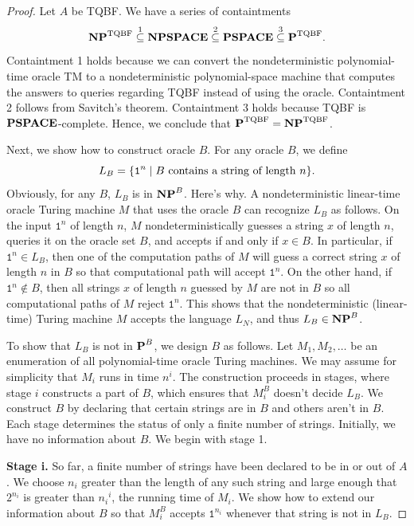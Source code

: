 \begin{proof}
  Let $A$ be TQBF. We have a series of containtments
  \[ \textbf{NP}^{\text{TQBF}} \overset{1}{\subseteq} \textbf{NPSPACE} \overset{2}{\subseteq} \textbf{PSPACE} \overset{3}{\subseteq} \textbf{P}^{\text{TQBF}}. \]
  Containtment 1 holds because we can convert the nondeterministic polynomial-time oracle TM to a nondeterministic polynomial-space machine that computes the answers to queries regarding TQBF instead of using the oracle. Containtment 2 follows from Savitch's theorem. Containtment 3 holds because TQBF is $\textbf{PSPACE}$-complete. Hence, we conclude that $\textbf{P}^{\text{TQBF}} = \textbf{NP}^{\text{TQBF}}$.

  Next, we show how to construct oracle $B$. For any oracle $B$, we define
  \[ L_B = \{ \texttt{1}^n \mid \text{$B$ contains a string of length $n$}  \}. \]
  Obviously, for any $B$, $L_B$ is in $\textbf{NP}^B$. Here's why. A nondeterministic linear-time oracle Turing machine $M$ that uses the oracle $B$ can recognize $L_B$ as follows. On the input $\texttt{1}^n$ of length $n$, $M$ nondeterministically guesses a string $x$ of length $n$, queries it on the oracle set $B$, and accepts if and only if $x \in B$. In particular, if $\texttt{1}^n \in L_B$, then one of the computation paths of $M$ will guess a correct string $x$ of length $n$ in $B$ so that computational path will accept $\texttt{1}^n$. On the other hand, if $\texttt{1}^n \notin B$, then all strings $x$ of length $n$ guessed by $M$ are not in $B$ so all computational paths of $M$ reject $\texttt{1}^n$. This shows that the nondeterministic (linear-time) Turing machine $M$ accepts the language $L_N$, and thus $L_B \in \textbf{NP}^B$.

  To show that $L_B$ is not in $\textbf{P}^B$, we design $B$ as follows. Let $M_1, M_2, \dots$ be an enumeration of all polynomial-time oracle Turing machines. We may assume for simplicity that $M_i$ runs in time $n^i$. The construction proceeds in stages, where stage $i$ constructs a part of $B$, which ensures that $M_i^B$ doesn't decide $L_B$. We construct $B$ by declaring that certain strings are in $B$ and others aren't in $B$. Each stage determines the status of only a finite number of strings. Initially, we have no information about $B$. We begin with stage 1.

  \textbf{Stage i.} So far, a finite number of strings have been declared to be in or out of $A$. We choose $n_i$ greater than the length of any such string and large enough that $2^{n_i}$ is greater than ${n_i}^i$, the running time of $M_i$. We show how to extend our information about $B$ so that $M_i^B$ accepts $\texttt{1}^{n_i}$ whenever that string is not in $L_B$.


\end{proof}
